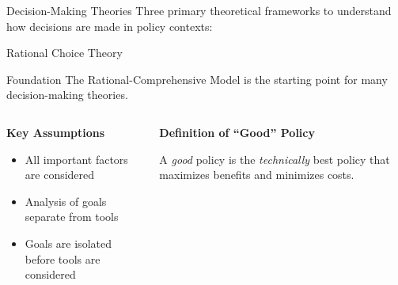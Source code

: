 \documentclass[10pt]{beamer}
\begin{document}
\begin{frame}{Decision-Making Theories}
Three primary theoretical frameworks to understand how decisions are made in policy contexts:

\vspace{1cm}
\begin{center}
\end{center}
\end{frame}

\begin{frame}{Rational Choice Theory}
\begin{block}{Foundation}
The Rational-Comprehensive Model is the starting point for many decision-making theories.
\end{block}

\vspace{0.5cm}
\begin{columns}
\begin{column}{0.5\textwidth}
\textbf{Key Assumptions}
\begin{itemize}
\item All important factors are considered
\item Analysis of goals separate from tools
\item Goals are isolated before tools are considered
\end{itemize}
\end{column}
\begin{column}{0.5\textwidth}
\textbf{Definition of ``Good'' Policy}

A \emph{good} policy is the \emph{technically} best policy that maximizes benefits and minimizes costs.
\end{column}
\end{columns}
\end{frame}
\end{document}
